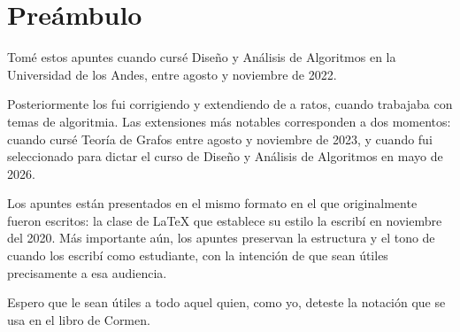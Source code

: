 \part*{Preámbulo}

Tomé estos apuntes cuando cursé Diseño y Análisis de Algoritmos en la Universidad de los Andes, entre agosto y noviembre de 2022. 

Posteriormente los fui corrigiendo y extendiendo de a ratos, cuando trabajaba con temas de algoritmia. Las extensiones más notables corresponden a dos momentos: cuando cursé Teoría de Grafos entre agosto y noviembre de 2023, y cuando fui seleccionado para dictar el curso de Diseño y Análisis de Algoritmos en mayo de 2026.

Los apuntes están presentados en el mismo formato en el que originalmente fueron escritos: la clase de \LaTeX{} que establece su estilo la escribí en noviembre del 2020. Más importante aún, los apuntes preservan la estructura y el tono de cuando los escribí como estudiante, con la intención de que sean útiles precisamente a esa audiencia.

Espero que le sean útiles a todo aquel quien, como yo, deteste la notación que se usa en el libro de Cormen.
